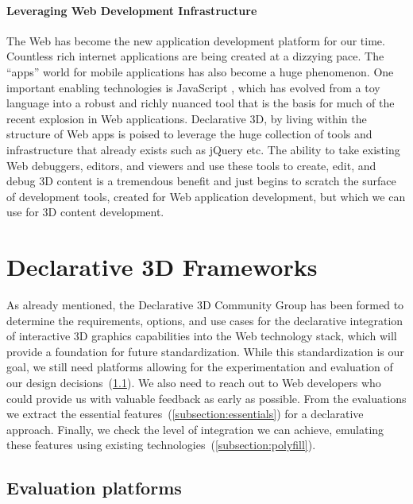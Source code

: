 \documentclass{acmsiggraph}
\begin{document}
\paragraph{Leveraging Web Development Infrastructure}
The Web has become the new application development platform for our time. Countless rich internet applications are being created at a dizzying pace. The ``apps'' world for mobile applications has also become a huge phenomenon. One important enabling technologies is JavaScript \cite{Crockford08}, which has evolved from a toy language into a robust and richly nuanced tool that is the basis for much of the recent explosion in Web applications.
Declarative 3D, by living within the structure of Web apps is poised to leverage the huge collection of tools and infrastructure that already exists such as jQuery \cite{jquery} etc. The ability to take existing Web debuggers, editors, and viewers and use these tools to create, edit, and debug 3D content is a tremendous benefit and just begins to scratch the surface of development tools, created for Web application development, but which we can use for 3D content development.



\section{Declarative 3D Frameworks}
\label{sec:Frameworks}

As already mentioned, the Declarative 3D Community Group \cite{Dec3D} has been formed to determine the requirements, options, and use cases for the declarative integration of interactive 3D graphics capabilities into the Web technology stack, which will provide a foundation for future standardization. While this standardization is our goal, we still need platforms allowing for the experimentation and evaluation of our design decisions~(\ref{subsection:evaluation}). We also need to reach out to Web developers who could provide us with valuable feedback as early as possible. From the evaluations we extract the essential features~(\ref{subsection:essentials}) for a declarative approach. Finally, we check the level of integration we can achieve, emulating these features using existing technologies~(\ref{subsection:polyfill}).


\subsection{Evaluation platforms}
\label{subsection:evaluation}
\end{document}
